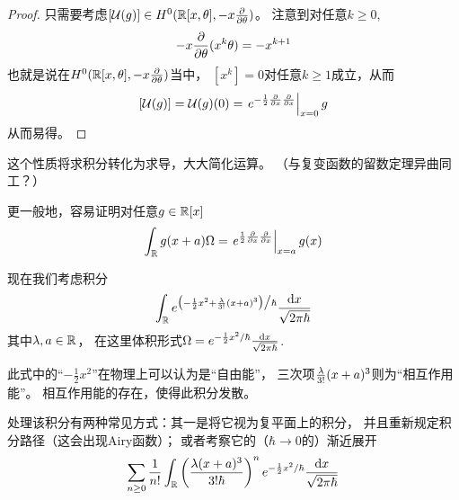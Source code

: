 \begin{proof}
只需要考虑$[\mathcal{U}(g)]\in H^0(\mathbb{R}[x,\theta],-x\frac{\partial } {\partial \theta})$。
注意到对任意$k\geq 0$,
$$-x\frac{\partial } {\partial \theta}(x^k\theta)=-x^{k+1}$$
也就是说在$H^0(\mathbb{R}[x,\theta],-x\frac{\partial } {\partial \theta})$当中，
$[x^k]=0$对任意$k\geq 1$成立，从而
$$[\mathcal{U}(g)]=\mathcal{U}(g)(0)
=\left.
   e^{-\frac{1}{2}\frac{\partial } {\partial x}\frac{\partial } {\partial x}}
 \right|_{x=0}g
$$
从而易得。
\end{proof}
这个性质将求积分转化为求导，大大简化运算。
（与复变函数的留数定理异曲同工？）

更一般地，容易证明对任意$g\in\mathbb{R}[x]$
$$\int_{\mathbb{R}}g(x+a)\Omega=
\left.
  e^{\frac{1}{2}\frac{\partial } {\partial x}\frac{\partial } {\partial x}}
\right|_{x=a}g(x)$$

\begin{Example}现在我们考虑积分%
$$
  \int_{\mathbb{R}}
    e^{\big(-\frac{1}{2}x^2+\frac{\lambda}{3!}(x+a)^3\big)\big/\hbar}
    \frac{\mathrm{d} x}{\sqrt{2\pi\hbar}}
$$
其中$\lambda,a\in\mathbb{R}$，
在这里体积形式$\Omega=e^{-\frac{1}{2}x^2/\hbar}
\frac{\mathrm{d} x}{\sqrt{2\pi\hbar}}$.
\end{Example}

此式中的“$-\frac{1}{2}x^2$”在物理上可以认为是“自由能”，
三次项$\frac{\lambda}{3!}(x+a)^3$则为“相互作用能”。
相互作用能的存在，使得此积分发散。

处理该积分有两种常见方式：其一是将它视为复平面上的积分，
并且重新规定积分路径（这会出现Airy函数）；
或者考察它的（$\hbar\to 0$的）渐近展开
$$
  \sum_{n\geq 0}\frac{1}{n!}
    \int_{\mathbb{R}}
      \left(
        \frac{\lambda (x+a)^3}{3!\hbar}
      \right)^n
      e^{-\frac{1}{2}x^2/\hbar}
      \frac{\mathrm{d} x}{\sqrt{2\pi\hbar}}
$$


